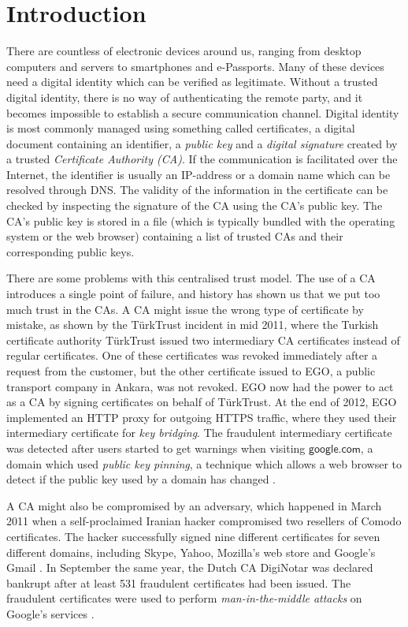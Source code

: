 \documentclass{style/kththesis}
\begin{document}
\chapter{Introduction}
There are countless of electronic devices around us, ranging from desktop computers and servers to smartphones and e-Passports. Many of these devices need a digital identity which can be verified as legitimate. Without a trusted digital identity, there is no way of authenticating the remote party, and it becomes impossible to establish a secure communication channel. Digital identity is most commonly managed using something called certificates, a digital document containing an identifier, a \emph{public key} and a \emph{digital signature} created by a trusted \emph{Certificate Authority (CA)}. If the communication is facilitated over the Internet, the identifier is usually an IP-address or a domain name which can be resolved through DNS. The validity of the information in the certificate can be checked by inspecting the signature of the CA using the CA's public key. The CA's public key is stored in a file (which is typically bundled with the operating system or the web browser) containing a list of trusted CAs and their corresponding public keys.

There are some problems with this centralised trust model. The use of a CA introduces a single point of failure, and history has shown us that we put too much trust in the CAs. A CA might issue the wrong type of certificate by mistake, as shown by the TürkTrust incident in mid 2011, where the Turkish certificate authority TürkTrust issued two intermediary CA certificates instead of regular certificates. One of these certificates was revoked immediately after a request from the customer, but the other certificate issued to EGO, a public transport company in Ankara, was not revoked. EGO now had the power to act as a CA by signing certificates on behalf of TürkTrust. At the end of 2012, EGO implemented an HTTP proxy for outgoing HTTPS traffic, where they used their intermediary certificate for \textit{key bridging}. The fraudulent intermediary certificate was detected after users started to get warnings when visiting $\mathsf{google.com}$, a domain which used \emph{public key pinning}, a technique which allows a web browser to detect if the public key used by a domain has changed \cite{Ducklin13}.

A CA might also be compromised by an adversary, which happened in March 2011 when a self-proclaimed Iranian hacker compromised two resellers of Comodo certificates. The hacker successfully signed nine different certificates for seven different domains, including Skype, Yahoo, Mozilla's web store and Google's Gmail \cite{Leyden11}. In September the same year, the Dutch CA DigiNotar was declared bankrupt after at least 531 fraudulent certificates had been issued. The fraudulent certificates were used to perform \emph{man-in-the-middle attacks} on Google's services \cite{Fox11}.
\end{document}
